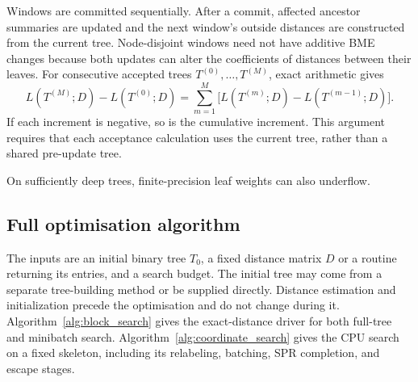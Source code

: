 \documentclass[11pt,a4paper]{article}
\makeatletter
\DeclareRobustCommand{\_}{\ifmmode\nfss@text{\textunderscore}\else\textunderscore\allowbreak\fi}
\theoremstyle{definition}
\makeatother
\begin{document}
Windows are committed sequentially.
After a commit, affected ancestor summaries are updated and the next window's outside distances are constructed from the current tree.
Node-disjoint windows need not have additive BME changes because both updates can alter the coefficients of distances between their leaves.
For consecutive accepted trees $T^{(0)},\ldots,T^{(M)}$, exact arithmetic gives
\begin{equation}
 L(T^{(M)};D)-L(T^{(0)};D)
 =\sum_{m=1}^M\bigl[L(T^{(m)};D)-L(T^{(m-1)};D)\bigr].
 \label{eq:telescoping}
\end{equation}
If each increment is negative, so is the cumulative increment.
This argument requires that each acceptance calculation uses the current tree, rather than a shared pre-update tree.

On sufficiently deep trees, finite-precision leaf weights can also underflow.

\subsection{Full optimisation algorithm}
\label{sec:optimizer}

The inputs are an initial binary tree $T_0$, a fixed distance matrix $D$ or a routine returning its entries, and a search budget.
The initial tree may come from a separate tree-building method or be supplied directly.
Distance estimation and initialization precede the optimisation and do not change during it.
Algorithm~\ref{alg:block_search} gives the exact-distance driver for both full-tree and minibatch search.
Algorithm~\ref{alg:coordinate_search} gives the CPU search on a fixed skeleton, including its relabeling, batching, SPR completion, and escape stages.
\end{document}
